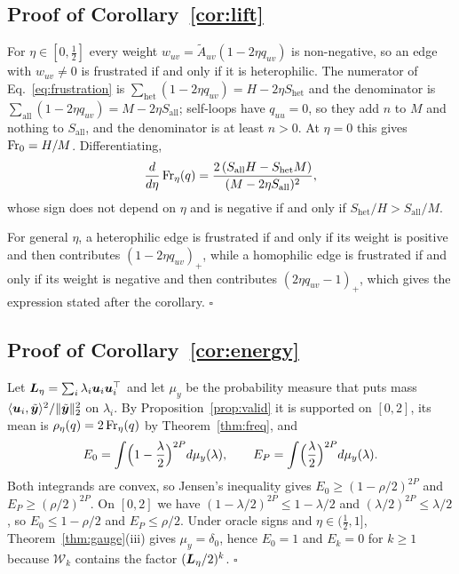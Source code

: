 \subsection{Proof of Corollary~\ref{cor:lift}}
For $\eta\in[0,\tfrac12]$ every weight $w_{uv}=\tilde A_{uv}(1-2\eta q_{uv})$ is non-negative, so an edge with $w_{uv}\neq0$ is frustrated if and only if it is heterophilic.
The numerator of Eq.~\eqref{eq:frustration} is $\sum_{\mathrm{het}}(1-2\eta q_{uv})=H-2\eta S_{\mathrm{het}}$ and the denominator is $\sum_{\mathrm{all}}(1-2\eta q_{uv})=M-2\eta S_{\mathrm{all}}$; self-loops have $q_{uu}=0$, so they add $n$ to $M$ and nothing to $S_{\mathrm{all}}$, and the denominator is at least $n>0$.
At $\eta=0$ this gives $\operatorname{Fr}_0=H/M$.
Differentiating,
\[
\frac{d}{d\eta}\operatorname{Fr}_\eta(q)=\frac{2\,(S_{\mathrm{all}}H-S_{\mathrm{het}}M)}{(M-2\eta S_{\mathrm{all}})^2},
\]
whose sign does not depend on $\eta$ and is negative if and only if $S_{\mathrm{het}}/H>S_{\mathrm{all}}/M$.

For general $\eta$, a heterophilic edge is frustrated if and only if its weight is positive and then contributes $(1-2\eta q_{uv})_+$, while a homophilic edge is frustrated if and only if its weight is negative and then contributes $(2\eta q_{uv}-1)_+$, which gives the expression stated after the corollary.
\hfill$\square$

\subsection{Proof of Corollary~\ref{cor:energy}}
Let $\bm{L}_{\eta}=\sum_i\lambda_i\bm u_i\bm u_i^{\top}$ and let $\mu_y$ be the probability measure that puts mass $\langle\bm u_i,\tilde{\bm{y}}\rangle^2/\|\tilde{\bm{y}}\|_2^2$ on $\lambda_i$.
By Proposition~\ref{prop:valid} it is supported on $[0,2]$, its mean is $\rho_\eta(q)=2\operatorname{Fr}_\eta(q)$ by Theorem~\ref{thm:freq}, and
\[
E_0=\int\Bigl(1-\frac\lambda2\Bigr)^{2P}d\mu_y(\lambda),\qquad
E_P=\int\Bigl(\frac\lambda2\Bigr)^{2P}d\mu_y(\lambda).
\]
Both integrands are convex, so Jensen's inequality gives $E_0\ge(1-\rho/2)^{2P}$ and $E_P\ge(\rho/2)^{2P}$.
On $[0,2]$ we have $(1-\lambda/2)^{2P}\le1-\lambda/2$ and $(\lambda/2)^{2P}\le\lambda/2$, so $E_0\le1-\rho/2$ and $E_P\le\rho/2$.
Under oracle signs and $\eta\in(\tfrac12,1]$, Theorem~\ref{thm:gauge}(iii) gives $\mu_y=\delta_0$, hence $E_0=1$ and $E_k=0$ for $k\ge1$ because $\mathcal W_k$ contains the factor $(\bm{L}_{\eta}/2)^k$.
\hfill$\square$

